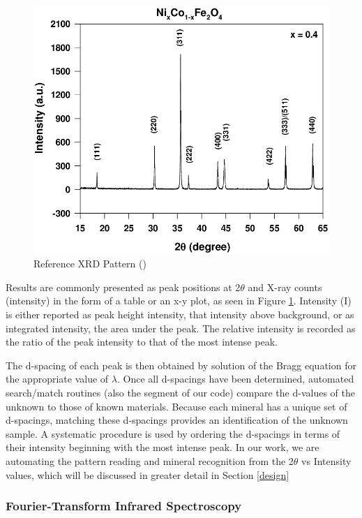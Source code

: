 \documentclass{dhbenelux}
\begin{document}
\begin{figure}[!h]
    \centering
    \includegraphics[scale=0.4]{XRD1.PNG}
    \caption{Reference XRD Pattern (\cite{XRD1})}
    \label{fig:XRD1}
    
\end{figure}

Results are commonly presented as peak positions at 2$\theta$ and X-ray counts (intensity) in the form of a table or an x-y plot, as seen in Figure \ref{fig:XRD1}. Intensity (I) is either reported as peak height intensity, that intensity above background, or as integrated intensity, the area under the peak. The relative intensity is recorded as the ratio of the peak intensity to that of the most intense peak.

The d-spacing of each peak is then obtained by solution of the Bragg equation for the appropriate value of $\lambda$. Once all d-spacings have been determined, automated search/match routines (also the segment of our code) compare the d-values of the unknown to those of known materials. Because each mineral has a unique set of d-spacings, matching these d-spacings provides an identification of the unknown sample. A systematic procedure is used by ordering the d-spacings in terms of their intensity beginning with the most intense peak. In our work, we are automating the pattern reading and mineral recognition from the 2$\theta$ vs Intensity values, which will be discussed in greater detail in Section \ref{design} 

\subsubsection{Fourier-Transform Infrared Spectroscopy}
\end{document}
